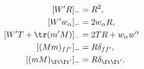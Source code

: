 \begin{equation}
\begin{split}
 [W'R]_-&=   R^2,\\
 [W'w_\alpha]_-&=2w_\alpha R,\\
 [W'T+\tr(m'M)]_-&=  2TR+w_\alpha w^\alpha\\
 [(Mm)_{ff'}]_-    &= R\delta_{ff'},\\
 [(mM)_{\ft\ft'}]_- &= R\delta_{\ft\ft'}.
\end{split}
\label{eq:loop_eq_gt_U(N)}
\end{equation}

